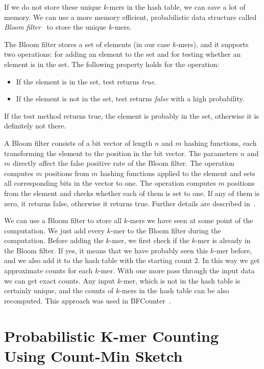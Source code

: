 If we do not store these unique $k$-mers in the hash table, we can save a lot of memory. We can use a more memory efficient, probabilistic data structure called \emph{Bloom filter}~\cite{bloomfilter} to store the unique $k$-mers.

The Bloom filter stores a set of elements (in our case $k$-mers), and it supports two operations:  for adding an element to the set and  for testing whether an element is in the set. The following property holds for the  operation:
\begin{itemize}
  \item If the element is in the set, test returns \emph{true}.
  \item If the element is not in the set, test returns \emph{false} with a high probability.
\end{itemize}
If the test method returns true, the element is probably in the set, otherwise it is definitely not there.

A Bloom filter consists of a bit vector of length $n$ and $m$ hashing functions, each transforming the element to the position in the bit vector. The parameters $n$ and $m$ directly affect the false positive rate of the Bloom filter.
The  operation computes $m$ positions from $m$ hashing functions applied to the element and sets all corresponding bits in the vector to one.
The  operation computes $m$ positions from the element and checks whether each of them is set to one. If any of them is zero, it returns false, otherwise it returns true. Further details are described in~\cite{bloomfilter}.

We can use a Bloom filter to store all $k$-mers we have seen at some point of the computation. We just add every $k$-mer to the Bloom filter during the computation. Before adding the $k$-mer, we first check if the $k$-mer is already in the Bloom filter. If yes, it means that we have probably seen this $k$-mer before, and we also add it to the hash table with the starting count 2. In this way we get approximate counts for each $k$-mer.
With one more pass through the input data we can get exact counts.
Any input $k$-mer, which is not in the hash table is certainly unique, and the counts of $k$-mers in the hash table can be also recomputed. This approach was used in BFCounter~\cite{bfcounter}.

\section[Probabilistic K-mer Counting]{Probabilistic K-mer Counting Using Count-Min Sketch}


